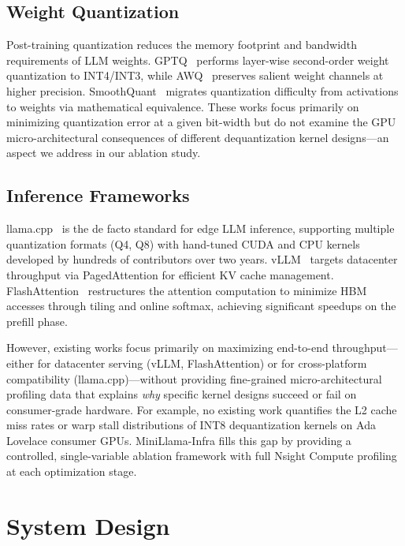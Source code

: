 \documentclass[conference]{IEEEtran}
\begin{document}
\subsection{Weight Quantization}
Post-training quantization reduces the memory footprint and bandwidth requirements of LLM weights. GPTQ~\cite{frantar2022gptq} performs layer-wise second-order weight quantization to INT4/INT3, while AWQ~\cite{lin2023awq} preserves salient weight channels at higher precision. SmoothQuant~\cite{xiao2023smoothquant} migrates quantization difficulty from activations to weights via mathematical equivalence. These works focus primarily on minimizing quantization error at a given bit-width but do not examine the GPU micro-architectural consequences of different dequantization kernel designs---an aspect we address in our ablation study.

\subsection{Inference Frameworks}
llama.cpp~\cite{llamacpp} is the de facto standard for edge LLM inference, supporting multiple quantization formats (Q4, Q8) with hand-tuned CUDA and CPU kernels developed by hundreds of contributors over two years. vLLM~\cite{kwon2023vllm} targets datacenter throughput via PagedAttention for efficient KV cache management. FlashAttention~\cite{dao2022flashattention} restructures the attention computation to minimize HBM accesses through tiling and online softmax, achieving significant speedups on the prefill phase.

However, existing works focus primarily on maximizing end-to-end throughput---either for datacenter serving (vLLM, FlashAttention) or for cross-platform compatibility (llama.cpp)---without providing fine-grained micro-architectural profiling data that explains \emph{why} specific kernel designs succeed or fail on consumer-grade hardware. For example, no existing work quantifies the L2 cache miss rates or warp stall distributions of INT8 dequantization kernels on Ada Lovelace consumer GPUs. MiniLlama-Infra fills this gap by providing a controlled, single-variable ablation framework with full Nsight Compute profiling at each optimization stage.

\section{System Design}
\end{document}
